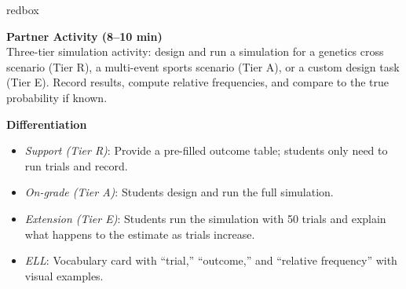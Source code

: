 \documentclass[10pt]{article}
\begin{document}
\begin{skillbox}{redbox}
\begin{minipage}[t]{0.48\linewidth}
    \textbf{Partner Activity (8--10 min)}\\
    Three-tier simulation activity: design and run a simulation for a genetics cross
    scenario (Tier R), a multi-event sports scenario (Tier A), or a custom design task
    (Tier E). Record results, compute relative frequencies, and compare to the true
    probability if known.
\end{minipage}
\hfill
\begin{minipage}[t]{0.48\linewidth}
    \textbf{Differentiation}
    \begin{itemize}
        \item \textit{Support (Tier R)}: Provide a pre-filled outcome table; students
              only need to run trials and record.
        \item \textit{On-grade (Tier A)}: Students design and run the full simulation.
        \item \textit{Extension (Tier E)}: Students run the simulation with 50 trials
              and explain what happens to the estimate as trials increase.
        \item \textit{ELL}: Vocabulary card with ``trial,'' ``outcome,'' and ``relative
              frequency'' with visual examples.
    \end{itemize}
\end{minipage}
\end{skillbox}
\end{document}
